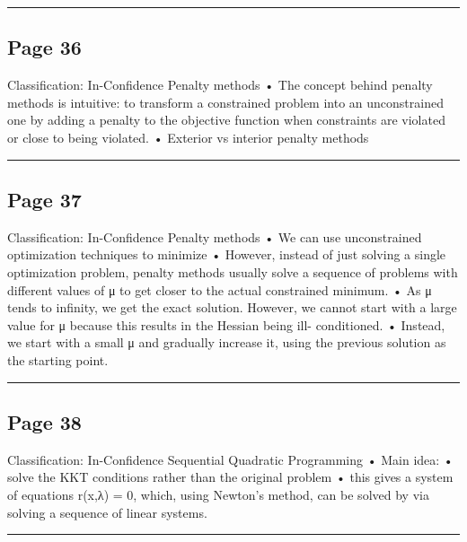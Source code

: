 \documentclass[
]{article}
\begin{document}
\begin{center}\rule{0.5\linewidth}{0.5pt}\end{center}

\subsection{Page 36}\label{page-36}

Classification: In-Confidence Penalty methods • The concept behind
penalty methods is intuitive: to transform a constrained problem into an
unconstrained one by adding a penalty to the objective function when
constraints are violated or close to being violated. • Exterior vs
interior penalty methods

\begin{center}\rule{0.5\linewidth}{0.5pt}\end{center}

\subsection{Page 37}\label{page-37}

Classification: In-Confidence Penalty methods • We can use unconstrained
optimization techniques to minimize • However, instead of just solving a
single optimization problem, penalty methods usually solve a sequence of
problems with different values of μ to get closer to the actual
constrained minimum. • As μ tends to infinity, we get the exact
solution. However, we cannot start with a large value for μ because this
results in the Hessian being ill- conditioned. • Instead, we start with
a small μ and gradually increase it, using the previous solution as the
starting point.

\begin{center}\rule{0.5\linewidth}{0.5pt}\end{center}

\subsection{Page 38}\label{page-38}

Classification: In-Confidence Sequential Quadratic Programming • Main
idea: • solve the KKT conditions rather than the original problem • this
gives a system of equations r(x,λ) = 0, which, using Newton's method,
can be solved by via solving a sequence of linear systems.

\begin{center}\rule{0.5\linewidth}{0.5pt}\end{center}
\end{document}
